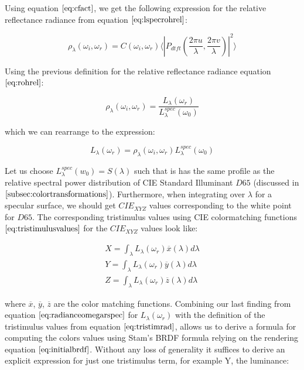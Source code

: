 Using equation $\ref{eq:cfact}$, we get the following expression for the relative reflectance radiance from equation $\ref{eq:lspecrohrel}$:

\begin{equation}
\rho_\lambda(\omega_i,\omega_r) =  C(\omega_i,\omega_r) \langle \left|P_{dtft}(\frac{2\pi u}{\lambda}, \frac{2\pi v}{\lambda})\right|^2\rangle
\label{eq:cpterm}
\end{equation}

Using the previous definition for the relative reflectance radiance equation $\ref{eq:rohrel}$:

\begin{equation}
 \rho_\lambda(\omega_i,\omega_r) = \frac{L_\lambda(\omega_r)}{L_\lambda^{spec}(\omega_0)} \nonumber
\end{equation}

which we can rearrange to the expression: 

\begin{equation}
L_\lambda(\omega_r) = \rho_\lambda(\omega_i,\omega_r)L_\lambda^{spec}(\omega_0)
\label{eq:radianceomegarspec}
\end{equation}

Let us choose $L_\lambda^{spec}(w_0) = S(\lambda)$ such that is has the same profile as the relative spectral power distribution of CIE Standard Illuminant $D65$ (discussed in $\ref{subsec:colortransformations}$). Furthermore, when integrating over $\lambda$ for a specular surface, we should get $CIE_{XYZ}$ values corresponding to the white point for $D65$. The corresponding tristimulus values using CIE colormatching functions $\ref{eq:tristimulusvalues}$ for the $CIE_{XYZ}$ values look like:

\begin{align}
X = \int_{\lambda}L_\lambda(\omega_r)\overline{x}(\lambda)d\lambda \nonumber \\
Y = \int_{\lambda}L_\lambda(\omega_r)\overline{y}(\lambda)d\lambda \nonumber \\
Z = \int_{\lambda}L_\lambda(\omega_r)\overline{z}(\lambda)d\lambda
\label{eq:tristimrad}
\end{align}

where $\overline{x}$, $\overline{y}$, $\overline{z}$ are the color matching functions. Combining our last finding from equation $\ref{eq:radianceomegarspec}$ for $L_\lambda(\omega_r)$ with the definition of the tristimulus values from equation $\ref{eq:tristimrad}$, allows us to 
derive a formula for computing the colors values using Stam's BRDF formula relying on the rendering equation $\ref{eq:initialbrdf}$. Without any loss of generality it suffices to derive an explicit expression for just one tristimulus term, for example Y, the luminance:

